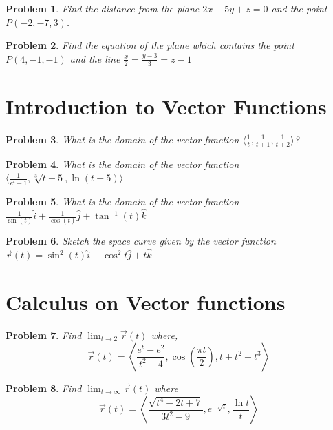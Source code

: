 \documentclass[11pt]{article}
\newtheorem{problem}{Problem}
\begin{document}
\begin{problem}
    Find the distance from the plane $2x-5y+z = 0$ and the point $P(-2,-7,3)$.
\end{problem}

\begin{problem}
    Find the equation of the plane which contains the point $P(4,-1,-1)$ and the line $\frac{x}{2}=\frac{y-3}{3}=z-1$
\end{problem}

\section{Introduction to Vector Functions}

\begin{problem}
What is the domain of the vector function $\langle \frac{1}{t}, \frac{1}{t+1}, \frac{1}{t+2}\rangle$?
\end{problem}

\begin{problem}
What is the domain of the vector function $\langle \frac{1}{e^t-1}, \sqrt[3]{t+5}, \ln(t+5)\rangle$
\end{problem}

\begin{problem}
    What is the domain of the vector function $\frac{1}{\sin(t)}\hat{i} + \frac{1}{\cos(t)}\hat{j} + \tan^{-1}(t)\hat{k}$
\end{problem}

\begin{problem}
    Sketch the space curve given by the vector function $\vec{r}(t) = \sin^2(t)\hat{i}+\cos^2{t}\hat{j}+t\hat{k}$
\end{problem}

\section{Calculus on Vector functions}

\begin{problem}
    Find $\lim_{t\to 2} \vec{r}(t)$ where,\[\vec{r}(t) = \left\langle \frac{e^t-e^2}{t^2-4}, \cos \left(\frac{\pi t}{2}\right), t+t^2+t^3\right\rangle\]
\end{problem}

\begin{problem}
    Find $\lim_{t\to \infty} \vec{r}(t)$ where \[\vec{r}(t) = \left\langle \frac{\sqrt{t^4-2t+7}}{3t^2-9}, e^{-\sqrt{t}}, \frac{\ln{t}}{t}\right\rangle\]
\end{problem}
\end{document}
